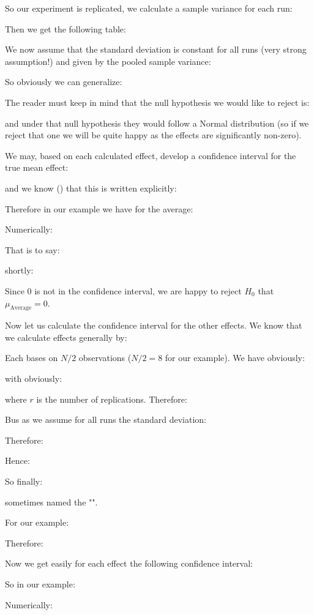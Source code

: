 	So our experiment is replicated, we calculate a sample variance for each run:
	
	Then we get the following table:
		
	We now assume that the standard deviation is constant for all runs (very strong assumption!) and given by the pooled sample variance:
	
	So obviously we can generalize:
	
	The reader must keep in mind that the null hypothesis we would like to reject is:
	
	and under that null hypothesis they would follow a Normal distribution (so if we reject that one we will be quite happy as the effects are significantly non-zero).
	
	We may, based on each calculated effect, develop a confidence interval for the true mean effect:
	
	and we know () that this is written explicitly:
	
	Therefore in our example we have for the average:
	
	Numerically:
	
	That is to say:
	
	shortly:
	
	Since $0$ is not in the confidence interval, we are happy to reject $H_0$ that $\mu_\text{Average}=0$.
	
	Now let us calculate the confidence interval for the other effects. We know that we calculate effects generally by:
	
	Each bases on $N/2$ observations ($N/2=8$ for our example). We have obviously:
	
	with obviously:
	
	where $r$ is the number of replications. Therefore:
	
	Bus as we assume for all runs the standard deviation:
	
	Therefore:
	
	Hence:
	
	So finally:
	
	sometimes named the "\NewTerm{}".
	
	For our example:
	
	Therefore:
	
	Now we get easily for each effect the following confidence interval:
	
	So in our example:
	
	Numerically:
	
